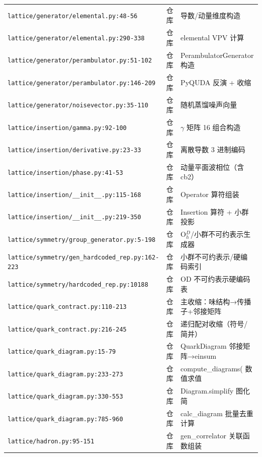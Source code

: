 \documentclass[UTF8]{ctexart}
\begin{document}
\begin{xltabular}{\textwidth}{llX}
\texttt{\nolinkurl{lattice/generator/elemental.py:48-56}} & 仓库 & 导数/动量维度构造 \\
\texttt{\nolinkurl{lattice/generator/elemental.py:290-338}} & 仓库 & elemental VPV 计算 \\
\texttt{\nolinkurl{lattice/generator/perambulator.py:51-102}} & 仓库 & PerambulatorGenerator 构造 \\
\texttt{\nolinkurl{lattice/generator/perambulator.py:146-209}} & 仓库 & PyQUDA 反演 + 收缩 \\
\texttt{\nolinkurl{lattice/generator/noisevector.py:35-110}} & 仓库 & 随机蒸馏噪声向量 \\
\texttt{\nolinkurl{lattice/insertion/gamma.py:92-100}} & 仓库 & $\gamma$ 矩阵 16 组合构造 \\
\texttt{\nolinkurl{lattice/insertion/derivative.py:23-33}} & 仓库 & 离散导数 3 进制编码 \\
\texttt{\nolinkurl{lattice/insertion/phase.py:41-53}} & 仓库 & 动量平面波相位（含 cb2） \\
\texttt{\nolinkurl{lattice/insertion/__init__.py:115-168}} & 仓库 & Operator 算符组装 \\
\texttt{\nolinkurl{lattice/insertion/__init__.py:219-350}} & 仓库 & Insertion 算符 + 小群投影 \\
\texttt{\nolinkurl{lattice/symmetry/group_generator.py:5-198}} & 仓库 & O$_h^D$/小群不可约表示生成器 \\
\texttt{\nolinkurl{lattice/symmetry/gen_hardcoded_rep.py:162-223}} & 仓库 & 小群不可约表示/硬编码索引 \\
\texttt{\nolinkurl{lattice/symmetry/hardcoded_rep.py:10188}} & 仓库 & OD 不可约表示硬编码表 \\
\texttt{\nolinkurl{lattice/quark_contract.py:110-213}} & 仓库 & 主收缩：味结构→传播子+邻接矩阵 \\
\texttt{\nolinkurl{lattice/quark_contract.py:216-245}} & 仓库 & 递归配对收缩（符号/简并） \\
\texttt{\nolinkurl{lattice/quark_diagram.py:15-79}} & 仓库 & QuarkDiagram 邻接矩阵→einsum \\
\texttt{\nolinkurl{lattice/quark_diagram.py:233-273}} & 仓库 & compute\_diagrams( 数值求值 \\
\texttt{\nolinkurl{lattice/quark_diagram.py:330-553}} & 仓库 & Diagram.simplify 图化简 \\
\texttt{\nolinkurl{lattice/quark_diagram.py:785-960}} & 仓库 & calc\_diagram 批量去重计算 \\
\texttt{\nolinkurl{lattice/hadron.py:95-151}} & 仓库 & gen\_correlator 关联函数组装 \\

\end{xltabular}
\end{document}

